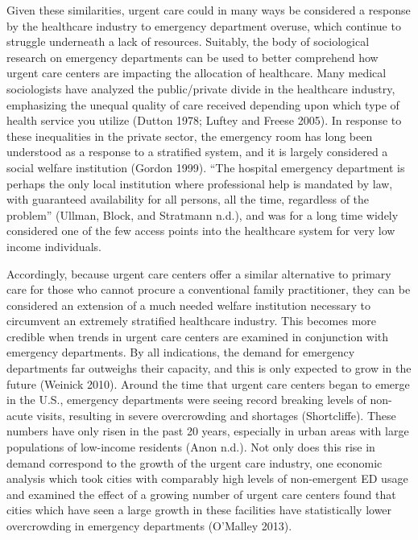 \documentclass[12pt,twoside]{reedthesis}
\begin{document}
  Given these similarities, urgent care could in many ways be considered a
  response by the healthcare industry to emergency department overuse,
  which continue to struggle underneath a lack of resources. Suitably, the
  body of sociological research on emergency departments can be used to
  better comprehend how urgent care centers are impacting the allocation
  of healthcare. Many medical sociologists have analyzed the
  public/private divide in the healthcare industry, emphasizing the
  unequal quality of care received depending upon which type of health
  service you utilize (Dutton 1978; Luftey and Freese 2005). In response
  to these inequalities in the private sector, the emergency room has long
  been understood as a response to a stratified system, and it is largely
  considered a social welfare institution (Gordon 1999). ``The hospital
  emergency department is perhaps the only local institution where
  professional help is mandated by law, with guaranteed availability for
  all persons, all the time, regardless of the problem'' (Ullman, Block,
  and Stratmann n.d.), and was for a long time widely considered one of
  the few access points into the healthcare system for very low income
  individuals.
  
  Accordingly, because urgent care centers offer a similar alternative to
  primary care for those who cannot procure a conventional family
  practitioner, they can be considered an extension of a much needed
  welfare institution necessary to circumvent an extremely stratified
  healthcare industry. This becomes more credible when trends in urgent
  care centers are examined in conjunction with emergency departments. By
  all indications, the demand for emergency departments far outweighs
  their capacity, and this is only expected to grow in the future (Weinick
  2010). Around the time that urgent care centers began to emerge in the
  U.S., emergency departments were seeing record breaking levels of
  non-acute visits, resulting in severe overcrowding and shortages
  (Shortcliffe). These numbers have only risen in the past 20 years,
  especially in urban areas with large populations of low-income residents
  (Anon n.d.). Not only does this rise in demand correspond to the growth
  of the urgent care industry, one economic analysis which took cities
  with comparably high levels of non-emergent ED usage and examined the
  effect of a growing number of urgent care centers found that cities
  which have seen a large growth in these facilities have statistically
  lower overcrowding in emergency departments (O'Malley 2013).
  
\end{document}
